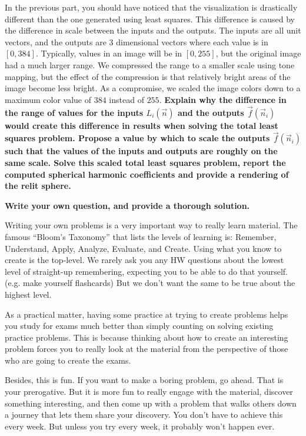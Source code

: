 \begin{Parts}
\Part In the previous part, you should have noticed that the visualization is drastically different than the one generated using least squares.  This difference is caused by the difference in scale between the inputs and the outputs.  The inputs are all unit vectors, and the outputs are 3 dimensional vectors where each value is in $[0,384]$.  Typically, values in an image will be in $[0,255]$, but the original image had a much larger range.  We compressed the range to a smaller scale using tone mapping, but the effect of the compression is that relatively bright areas of the image become less bright.  As a compromise, we scaled the image colors down to a maximum color value of $384$ instead of $255$. \textbf{Explain why the difference in the range of values for the inputs $L_i(\vec{n})$ and the outputs $\vec{f}(\vec{n}_i)$ would create this difference in results when solving the total least squares problem.  Propose a value by which to scale the outputs $\vec{f}(\vec{n}_i)$ such that the values of the inputs and outputs are roughly on the same scale. Solve this scaled total least squares problem, report the computed spherical harmonic coefficients and provide a rendering of the relit sphere.}



\end{Parts}

\pagebreak


{\bf Write your own question, and provide a thorough solution.}

Writing your own problems is a very important way to really learn
material. The famous ``Bloom's Taxonomy'' that lists the levels of
learning is: Remember, Understand, Apply, Analyze, Evaluate, and
Create. Using what you know to create is the top-level. We rarely ask
you any HW questions about the lowest level of straight-up
remembering, expecting you to be able to do that yourself. (e.g. make
yourself flashcards) But we don't want the same to be true about the
highest level.

As a practical matter, having some practice at trying to create
problems helps you study for exams much better than simply counting on
solving existing practice problems. This is because thinking about how
to create an interesting problem forces you to really look at the
material from the perspective of those who are going to create the
exams. 

Besides, this is fun. If you want to make a boring problem, go
ahead. That is your prerogative. But it is more fun to really engage
with the material, discover something interesting, and then come up
with a problem that walks others down a journey that lets them share
your discovery. You don't have to achieve this every week. But unless
you try every week, it probably won't happen ever. 